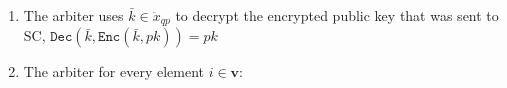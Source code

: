 \begin{enumerate}
\begin{enumerate}

\item The arbiter uses $\bar{k}\in \ddot{x}_{\scriptscriptstyle qp}$ to decrypt the encrypted public key that was sent to SC, $\mathtt{Dec}(\bar{k},\mathtt{Enc}(\bar{k},pk))=pk$



\item\label{the-arbiter-loop} The arbiter  for every element $i\in\bm{v}$:

\begin{enumerate}


\end{enumerate}
\end{enumerate}
\end{enumerate}
